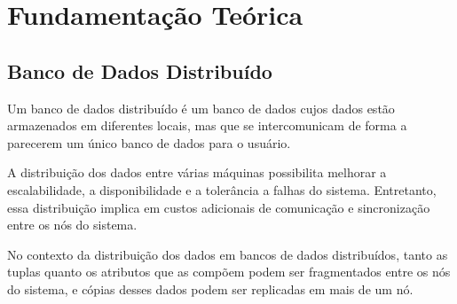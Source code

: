 \section{Fundamentação Teórica}
\subsection{Banco de Dados Distribuído}
Um banco de dados distribuído é um banco de dados cujos dados estão armazenados em diferentes locais, mas que se intercomunicam de forma a parecerem um único banco de dados para o usuário.

A distribuição dos dados entre várias máquinas possibilita melhorar a escalabilidade, a disponibilidade e a tolerância a falhas do sistema. Entretanto, essa distribuição implica em custos adicionais de comunicação e sincronização entre os nós do sistema.

No contexto da distribuição dos dados em bancos de dados distribuídos, tanto as tuplas quanto os atributos que as compõem podem ser fragmentados entre os nós do sistema, e cópias desses dados podem ser replicadas em mais de um nó.





